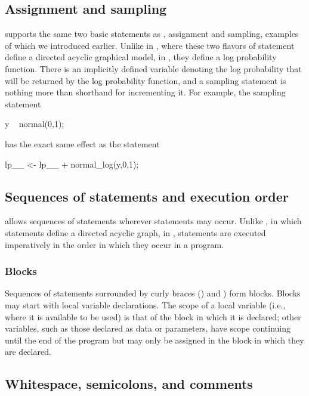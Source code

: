 \documentclass[article]{jss}
\begin{document}
\subsection{Assignment and sampling}

 supports the same two basic statements as
, assignment and sampling, examples of which we
introduced earlier.  Unlike in , where these two
flavors of statement define a directed acyclic graphical model, in
, they define a log probability function.  There is an
implicitly defined variable  denoting the log probability
that will be returned by the log probability function, and a sampling
statement is nothing more than shorthand for incrementing it.  For
example, the sampling statement
%
\begin{Code}
y ~ normal(0,1);
\end{Code}
%
has the exact same effect as the statement
%
\begin{Code}
lp__ <- lp__ + normal_log(y,0,1);
\end{Code}

\subsection{Sequences of statements and execution order}

 allows sequences of statements wherever statements may
occur. Unlike , in which statements define a directed
acyclic graph, in , statements are executed
imperatively in the order in which they occur in a program.

\subsubsection{Blocks}

Sequences of statements surrounded by curly braces (\code{\{}) and
\code{\}}) form blocks.  Blocks may start with local variable
declarations.  The scope of a local variable (i.e., where it is
available to be used) is that of the block in which it is declared;
other variables, such as those declared as data or parameters, have
scope continuing until the end of the program but may only be assigned
in the block in which they are declared.


\subsection{Whitespace, semicolons, and comments}
\end{document}
